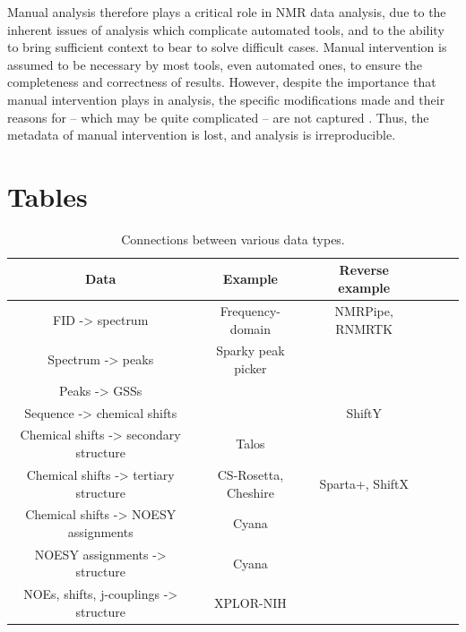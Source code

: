 Manual analysis therefore plays a critical role in NMR data analysis, due 
to the inherent issues of analysis which complicate automated tools, and 
to the ability to bring sufficient context to bear to solve difficult cases.  
Manual intervention is assumed to be necessary by 
most tools, even automated ones, to ensure the completeness and correctness 
of results.  However, despite the importance that manual intervention plays 
in analysis, the specific modifications made and their reasons for -- 
which may be quite complicated -- are not captured \cite{guntert2009automated}.  
Thus, the metadata of manual intervention is lost, and analysis is 
irreproducible.


\clearpage
\section{Tables}

\begin{table}[h]
    \begin{tabular}{ | c || c | c | c | c | c |}
    \hline
      Data                                      &  Example              &  Reverse example   \\  \hline
      FID -> spectrum                           &  Frequency-domain     &  NMRPipe, RNMRTK   \\  \hline
      Spectrum -> peaks                         &  Sparky peak picker   &                    \\  \hline
      Peaks -> GSSs                             &                       &                    \\  \hline
      Sequence -> chemical shifts               &                       &  ShiftY            \\  \hline
      Chemical shifts -> secondary structure    &  Talos                &                    \\  \hline
      Chemical shifts -> tertiary structure     &  CS-Rosetta, Cheshire &  Sparta+, ShiftX   \\  \hline
      Chemical shifts -> NOESY assignments      &  Cyana                &                    \\  \hline
      NOESY assignments -> structure            &  Cyana                &                    \\  \hline
      NOEs, shifts, j-couplings -> structure    &  XPLOR-NIH            &                    \\  \hline
    \end{tabular}
    \caption{Connections between various data types.}
    \label{data_connections}
\end{table}



